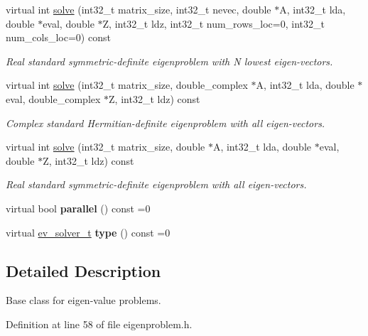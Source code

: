 \begin{DoxyCompactItemize}
virtual int \hyperlink{class_eigenproblem_a7fe0494ecbc2ad567bac5c3d599b1c4c}{solve} (int32\+\_\+t matrix\+\_\+size, int32\+\_\+t nevec, double $\ast$A, int32\+\_\+t lda, double $\ast$eval, double $\ast$Z, int32\+\_\+t ldz, int32\+\_\+t num\+\_\+rows\+\_\+loc=0, int32\+\_\+t num\+\_\+cols\+\_\+loc=0) const 
\begin{DoxyCompactList}\small\item\em Real standard symmetric-\/definite eigenproblem with N lowest eigen-\/vectors. \end{DoxyCompactList}\item 
virtual int \hyperlink{class_eigenproblem_ae93b1502e109105a05b39a1e15003850}{solve} (int32\+\_\+t matrix\+\_\+size, double\+\_\+complex $\ast$A, int32\+\_\+t lda, double $\ast$eval, double\+\_\+complex $\ast$Z, int32\+\_\+t ldz) const 
\begin{DoxyCompactList}\small\item\em Complex standard Hermitian-\/definite eigenproblem with all eigen-\/vectors. \end{DoxyCompactList}\item 
virtual int \hyperlink{class_eigenproblem_a6e9369d5c158ee7b13f6504281069c60}{solve} (int32\+\_\+t matrix\+\_\+size, double $\ast$A, int32\+\_\+t lda, double $\ast$eval, double $\ast$Z, int32\+\_\+t ldz) const 
\begin{DoxyCompactList}\small\item\em Real standard symmetric-\/definite eigenproblem with all eigen-\/vectors. \end{DoxyCompactList}\item 
\hypertarget{class_eigenproblem_aac210204945d9298f3d343cd43ebe9f7}{}virtual bool {\bfseries parallel} () const  =0\label{class_eigenproblem_aac210204945d9298f3d343cd43ebe9f7}

\item 
\hypertarget{class_eigenproblem_ae519f3d5249f8c2405d7693070c0a163}{}virtual \hyperlink{eigenproblem_8h_a203f2c57422a6e64834e6e9ab85982bf}{ev\+\_\+solver\+\_\+t} {\bfseries type} () const  =0\label{class_eigenproblem_ae519f3d5249f8c2405d7693070c0a163}

\end{DoxyCompactItemize}


\subsection{Detailed Description}
Base class for eigen-\/value problems. 

Definition at line 58 of file eigenproblem.\+h.



